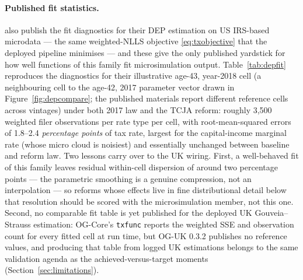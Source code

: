 \paragraph{Published fit statistics.} \citet{DeBackerEvansPhillips2019} also publish the fit diagnostics for their DEP estimation on US IRS-based microdata --- the same weighted-NLLS objective \eqref{eq:txobjective} that the deployed pipeline minimises --- and these give the only published yardstick for how well functions of this family fit microsimulation output. Table~\ref{tab:depfit} reproduces the diagnostics for their illustrative age-43, year-2018 cell (a neighbouring cell to the age-42, 2017 parameter vector drawn in Figure~\ref{fig:depcompare}; the published materials report different reference cells across vintages) under both 2017 law and the TCJA reform: roughly 3{,}500 weighted filer observations per rate type per cell, with root-mean-squared errors of 1.8--2.4 \emph{percentage points} of tax rate, largest for the capital-income marginal rate (whose micro cloud is noisiest) and essentially unchanged between baseline and reform law. Two lessons carry over to the UK wiring. First, a well-behaved fit of this family leaves residual within-cell dispersion of around two percentage points --- the parametric smoothing is a genuine compression, not an interpolation --- so reforms whose effects live in fine distributional detail below that resolution should be scored with the microsimulation member, not this one. Second, no comparable fit table is yet published for the deployed UK Gouveia--Strauss estimation: OG-Core's \texttt{txfunc} reports the weighted SSE and observation count for every fitted cell at run time, but OG-UK 0.3.2 publishes no reference values, and producing that table from logged UK estimations belongs to the same validation agenda as the achieved-versus-target moments (Section~\ref{sec:limitations}).

